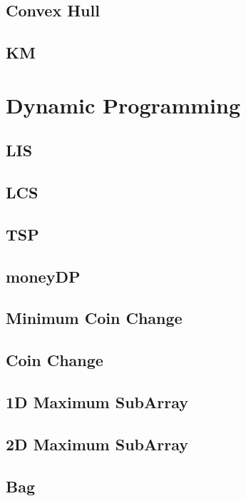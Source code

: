 \subsection{Convex Hull}

\subsection{KM}


\section{Dynamic Programming}
\subsection{LIS}

\subsection{LCS}

\subsection{TSP}

\subsection{moneyDP}

\subsection{Minimum Coin Change}

\subsection{Coin Change}

\subsection{1D Maximum SubArray}

\subsection{2D Maximum SubArray}

\subsection{Bag}


